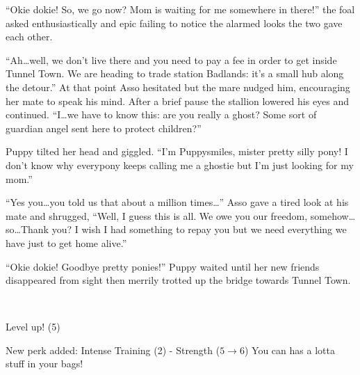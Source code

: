 ``Okie dokie! So, we go now? Mom is waiting for me somewhere in there!'' the foal asked enthusiastically and epic failing to notice the alarmed looks the two gave each other.

``Ah\dots well, we don't live there and you need to pay a fee in order to get inside Tunnel Town. We are heading to trade station Badlands: it's a small hub along the detour.'' At that point Asso hesitated but the mare nudged him, encouraging her mate to speak his mind. After a brief pause the stallion lowered his eyes and continued. ``I\dots we have to know this: are you really a ghost? Some sort of guardian angel sent here to protect children?''

Puppy tilted her head and giggled. ``I'm Puppysmiles, mister pretty silly pony! I don't know why everypony keeps calling me a ghostie but I'm just looking for my mom.''

``Yes you\dots you told us that about a million times\dots'' Asso gave a tired look at his mate and shrugged, ``Well, I guess this is all. We owe you our freedom, somehow\dots so\dots Thank you? I wish I had something to repay you but we need everything we have just to get home alive.''

``Okie dokie! Goodbye pretty ponies!'' Puppy waited until her new friends disappeared from sight then merrily trotted up the bridge towards Tunnel Town.

\clearpage

~\vfill

\begin{engnote}
Level up! (5)

New perk added: Intense Training (2) - Strength ($5 \to 6$) You can has a lotta stuff in your bags!
\end{engnote}



